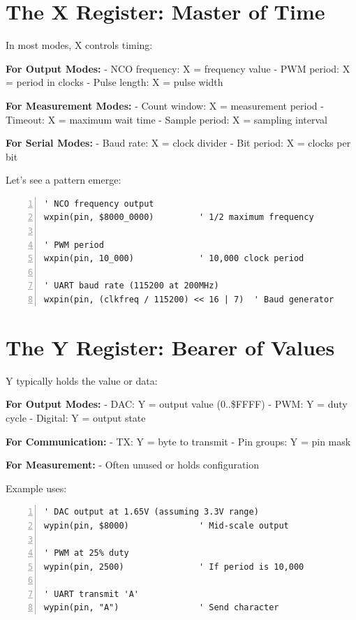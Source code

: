 \documentclass[11pt,a4paper,oneside,english]{book}
\begin{document}
\hypertarget{the-x-register-master-of-time}{%
\section{The X Register: Master of
Time}\label{the-x-register-master-of-time}}

In most modes, X controls timing:

\textbf{For Output Modes:} - NCO frequency: X = frequency value - PWM
period: X = period in clocks - Pulse length: X = pulse width

\textbf{For Measurement Modes:} - Count window: X = measurement period -
Timeout: X = maximum wait time - Sample period: X = sampling interval

\textbf{For Serial Modes:} - Baud rate: X = clock divider - Bit period:
X = clocks per bit

Let's see a pattern emerge:

\begin{Spin2Block}
\begin{Verbatim}[numbers=left,numbersep=5pt,xleftmargin=15pt]
' NCO frequency output
wxpin(pin, $8000_0000)         ' 1/2 maximum frequency

' PWM period
wxpin(pin, 10_000)             ' 10,000 clock period

' UART baud rate (115200 at 200MHz)
wxpin(pin, (clkfreq / 115200) << 16 | 7)  ' Baud generator
\end{Verbatim}
\end{Spin2Block}

\hypertarget{the-y-register-bearer-of-values}{%
\section{The Y Register: Bearer of
Values}\label{the-y-register-bearer-of-values}}

Y typically holds the value or data:

\textbf{For Output Modes:} - DAC: Y = output value (0..\$FFFF) - PWM: Y
= duty cycle - Digital: Y = output state

\textbf{For Communication:} - TX: Y = byte to transmit - Pin groups: Y =
pin mask

\textbf{For Measurement:} - Often unused or holds configuration

Example uses:

\begin{Spin2Block}
\begin{Verbatim}[numbers=left,numbersep=5pt,xleftmargin=15pt]
' DAC output at 1.65V (assuming 3.3V range)
wypin(pin, $8000)              ' Mid-scale output

' PWM at 25% duty
wypin(pin, 2500)               ' If period is 10,000

' UART transmit 'A'
wypin(pin, "A")                ' Send character
\end{Verbatim}
\end{Spin2Block}
\end{document}
